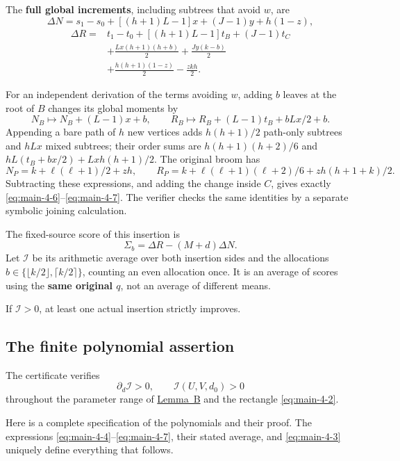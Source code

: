\documentclass[11pt,letterpaper]{article}
\theoremstyle{plain}
\begin{document}
The \textbf{full global increments}, including subtrees that avoid \(w\), are \[
\boxed{
\Delta N=s_1-s_0+[(h+1)L-1]x+(J-1)y+h(1-z),
}
\tag{4.6}\label{eq:main-4-6}
\] \[
\boxed{
\begin{aligned}
\Delta R={}&t_1-t_0+[(h+1)L-1]t_B+(J-1)t_C\\
&+\frac{Lx(h+1)(h+b)}2+\frac{Jy(k-b)}2\\
&+\frac{h(h+1)(1-z)}2-\frac{zkh}{2}.
\end{aligned}
}
\tag{4.7}\label{eq:main-4-7}
\]

For an independent derivation of the terms avoiding \(w\), adding \(b\) leaves at the root of \(B\) changes its global moments by \[
N_B\mapsto N_B+(L-1)x+b,
\qquad
R_B\mapsto R_B+(L-1)t_B+bLx/2+b.
\] Appending a bare path of \(h\) new vertices adds \(h(h+1)/2\) path-only subtrees and \(hLx\) mixed subtrees; their order sums are \(h(h+1)(h+2)/6\) and \(hL(t_B+bx/2)+Lxh(h+1)/2\). The original broom has \[
N_P=k+\ell(\ell+1)/2+zh,
\qquad
R_P=k+\ell(\ell+1)(\ell+2)/6+zh(h+1+k)/2.
\] Subtracting these expressions, and adding the change inside \(C\), gives exactly \eqref{eq:main-4-6}--\eqref{eq:main-4-7}. The verifier checks the same identities by a separate symbolic joining calculation.

The fixed-source score of this insertion is \[
\Sigma_b=\Delta R-(M+d)\Delta N.
\] Let \(\mathcal I\) be its arithmetic average over both insertion sides and the allocations \(b\in\{\lfloor k/2\rfloor,\lceil k/2\rceil\}\), counting an even allocation once. It is an average of scores using the \textbf{same original \(q\)}, not an average of different means.

If \(\mathcal I>0\), at least one actual insertion strictly improves.

\subsection{The finite polynomial assertion}\label{the-finite-polynomial-assertion}

The certificate verifies \[
\boxed{\partial_d\mathcal I>0,\qquad
\mathcal I(U,V,d_0)>0}
\tag{4.8}\label{eq:main-4-8}
\] throughout the parameter range of \hyperref[lem:broom]{Lemma~B} and the rectangle \eqref{eq:main-4-2}.

Here is a complete specification of the polynomials and their proof. The expressions \eqref{eq:main-4-4}--\eqref{eq:main-4-7}, their stated average, and \eqref{eq:main-4-3} uniquely define everything that follows.
\end{document}
